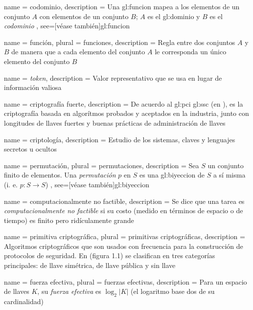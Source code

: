 {
  name = codominio,
  description = {
    Una \gls{gl:funcion} mapea a los elementos de un conjunto $A$ con elementos
    de un conjunto $B$; $A$ es el \gls{gl:dominio} y $B$ es el
    \textit{codominio}%
  },
  see=[véase también]{gl:funcion}
}

{
  name = función,
  plural = funciones,
  description = {
    Regla entre dos conjuntos $A$ y $B$ de manera que a cada elemento del
    conjunto $A$ le corresponda un único elemento del conjunto $B$%
  }
}

{
  name = \textit{token},
  description = {
    Valor representativo que se usa en lugar de información valiosa%
  }
}

{
  name = criptografía fuerte,
  description = {
    De acuerdo al \gls{gl:pci} \gls{gl:ssc} (en \cite{dss_glosario}), es la
    criptografía basada en algorítmos probados y aceptados en la industria,
    junto con longitudes de llaves fuertes y buenas prácticas de
    administración de llaves%
  }
}

{
  name = criptología,
  description = {
    Estudio de los sistemas, claves y lenguajes secretos u ocultos%
  }
}

{
  name = permutación,
  plural = permutaciones,
  description = {
    Sea $ S $ un conjunto finito de elementos. Una \textit{permutación} $ p $
    en $ S $ es una \gls{gl:biyeccion} de $ S $ a sí misma (i. e.
    $ p: S \rightarrow S $)%
  },
  see=[véase también]{gl:biyeccion}
}

{
  name = computacionalmente no factible,
  description = {
    Se dice que una tarea es \textit{computacionalmente no factible} si su
    costo (medido en términos de espacio o de tiempo) es finito pero
    ridículamente grande%
  }
}

{
  name = primitiva criptográfica,
  plural = primitivas criptográficas,
  description = {
    Algoritmos criptográficos que son usados con frecuencia para la
    construcción de protocolos de seguridad. En \cite{menezes} (figura 1.1)
    se clasifican en tres categorías principales: de llave simétrica, de
    llave pública y sin llave%
  }
}

{
  name = fuerza efectiva,
  plural = fuerzas efectivas,
  description = {
    Para un espacio de llaves $ K $, su \textit{fuerza efectiva} es
    $ \log_2 | K | $ (el logaritmo base dos de su cardinalidad)%
  }
}

